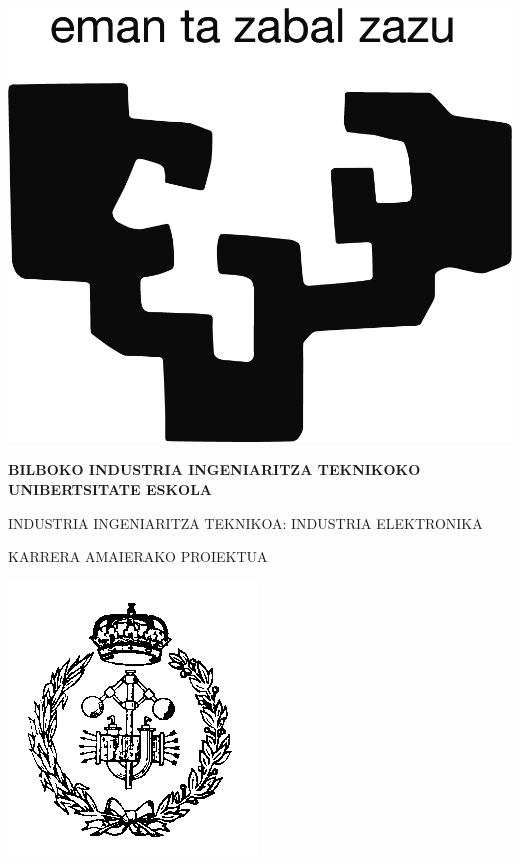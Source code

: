 %

\begin{minipage}{.1125\textwidth}
\centering\includegraphics[width=.95\textwidth]{./images/ehu.png}
\end{minipage}
\begin{minipage}{.7\textwidth}
\begin{center}
{\bfseries BILBOKO INDUSTRIA INGENIARITZA TEKNIKOKO\\UNIBERTSITATE ESKOLA}

\vspace{5pt}
\scriptsize INDUSTRIA INGENIARITZA TEKNIKOA: INDUSTRIA ELEKTRONIKA

\vspace{5pt}
KARRERA AMAIERAKO PROIEKTUA
\end{center}
\end{minipage}
\begin{minipage}{.1125\textwidth}
\centering\includegraphics[width=.95\textwidth]{./images/euiti.png}
\end{minipage}
